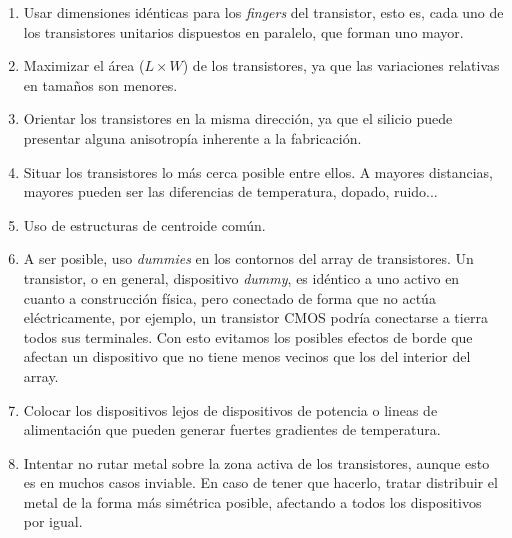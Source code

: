 \begin{enumerate}
	\item Usar dimensiones idénticas para los \textit{fingers} del transistor,
	esto es, cada uno de los transistores unitarios dispuestos en paralelo,
	que forman uno mayor.
	\item Maximizar el área ($L \times W$) de los transistores, ya que las
	variaciones relativas en tamaños son menores.
	\item Orientar los transistores en la misma dirección, ya que el silicio
	puede presentar alguna anisotropía inherente a la fabricación.
	\item Situar los transistores lo más cerca posible entre ellos. A mayores
	distancias, mayores pueden ser las diferencias de temperatura, dopado, ruido...
	\item Uso de estructuras de centroide común.
	\item A ser posible, uso \textit{dummies} en los contornos del
	array de transistores. Un transistor, o en general, dispositivo \textit{dummy},
	es idéntico a uno activo en cuanto a construcción física, pero conectado de
	forma que no actúa eléctricamente, por ejemplo, un transistor CMOS podría
	conectarse a tierra todos sus terminales.
	Con esto evitamos los posibles efectos de borde que afectan un dispositivo
	que no tiene menos vecinos que los del interior del array.
	\item Colocar los dispositivos lejos de dispositivos de potencia o lineas
	de alimentación que pueden generar fuertes gradientes de temperatura.
	\item Intentar no rutar metal sobre la zona activa de los transistores,
	aunque esto es en muchos casos inviable. En caso de tener que hacerlo, tratar
	distribuir el metal de la forma más simétrica posible, afectando a todos
	los dispositivos por igual.
\end{enumerate}
